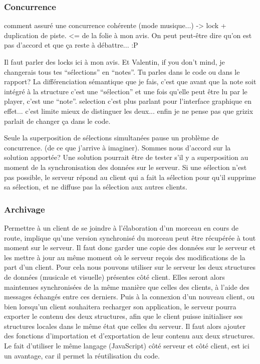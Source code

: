 \documentclass[pdftex,12pt,a4paper]{article}
\begin{document}
\subsubsection{Concurrence}

comment assuré une concurrence cohérente (mode musique...)
-> lock + duplication de piste. <= de la folie à mon avis.
On peut peut-être dire qu’on est pas d’accord et que ça reste à débattre... :P

Il faut parler des locks ici à mon avis.
Et Valentin, if you don’t mind, je changerais tous tes “sélections” en “notes”.
Tu parles dans le code ou dans le rapport?
La différenciation sémantique que je fais, c’est que avant que la note soit intégré à la structure c’est une “sélection” et une fois qu’elle peut être lu par le player, c’est une “note”. selection c’est plus parlant pour l’interface graphique en effet... c’est limite mieux de distinguer les deux... enfin je ne pense pas que grizix parlait de changer ça dans le code.

Seule la superposition de sélections simultanées pause un problème de concurrence. (de ce que j’arrive à imaginer).
Sommes nous d’accord sur la solution apportée?
Une solution pourrait être de tester s’il y a superposition au moment de la synchronisation des données sur le serveur. Si une sélection n’est pas possible, le serveur répond au client qui a fait la sélection pour qu’il supprime sa sélection, et ne diffuse pas la sélection aux autres clients. 

\subsubsection{Archivage}

Permettre à un client de se joindre à l’élaboration d’un morceau en cours de route, implique qu’une version synchronisé du morceau peut être récupérée à tout moment sur le serveur. Il faut donc garder une copie des données sur le serveur et les mettre à jour au même moment où le serveur reçois des modifications de la part d’un client.
Pour cela nous pouvons utiliser sur le serveur les deux structures de données (musicale et visuelle) présentes côté client. Elles seront alors maintenues synchronisées de la même manière que celles des clients, à l’aide des messages échangés entre ces derniers. Puis à la connexion d’un nouveau client, ou bien lorsqu’un client souhaitera recharger son application, le serveur pourra exporter le contenu des deux structures, afin que le client puisse initialiser ses structures locales dans le même état que celles du serveur. Il faut alors ajouter des fonctions d’importation et d’exportation de leur contenu aux deux structures. Le fait d’utiliser le même langage (JavaScript) côté serveur et côté client, est ici un avantage, car il permet la réutilisation du code.
\end{document}
